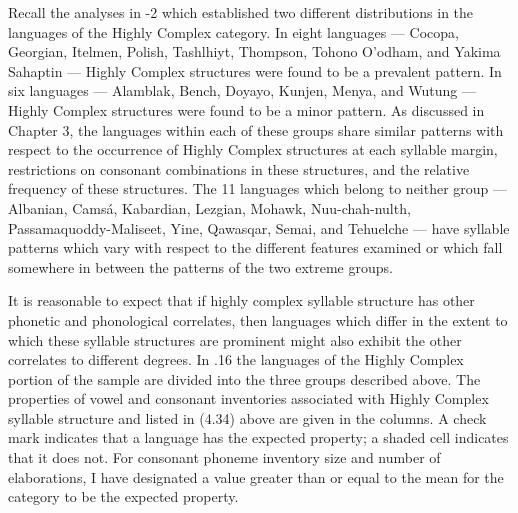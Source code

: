   Recall the analyses in -2 which established two different distributions in the languages of the Highly Complex category. In eight languages — Cocopa, Georgian, Itelmen, Polish, Tashlhiyt, Thompson, Tohono O’odham, and Yakima Sahaptin — Highly Complex structures were found to be a prevalent pattern. In six languages — Alamblak, Bench, Doyayo, Kunjen, Menya, and Wutung — Highly Complex structures were found to be a minor pattern. As discussed in Chapter 3, the languages within each of these groups share similar patterns with respect to the occurrence of Highly Complex structures at each syllable margin, restrictions on consonant combinations in these structures, and the relative frequency of these structures. The 11 languages which belong to neither group — Albanian, Camsá, Kabardian, Lezgian, Mohawk, Nuu-chah-nulth, Passamaquoddy-Maliseet, Yine, Qawasqar, Semai, and Tehuelche — have syllable patterns which vary with respect to the different features examined or which fall somewhere in between the patterns of the two extreme groups.

  It is reasonable to expect that if highly complex syllable structure has other phonetic and phonological correlates, then languages which differ in the extent to which these syllable structures are prominent might also exhibit the other correlates to different degrees. In .16 the languages of the Highly Complex portion of the sample are divided into the three groups described above. The properties of vowel and consonant inventories associated with Highly Complex syllable structure and listed in (4.34) above are given in the columns. A check mark indicates that a language has the expected property; a shaded cell indicates that it does not. For consonant phoneme inventory size and number of elaborations, I have designated a value greater than or equal to the mean for the category to be the expected property.


